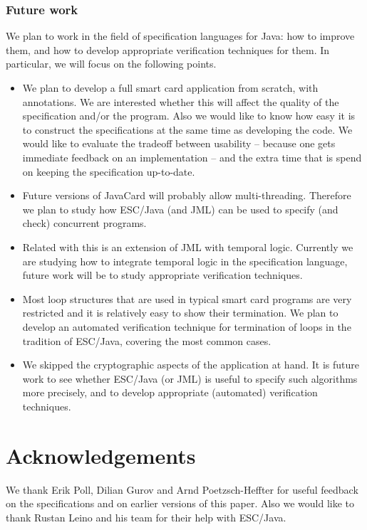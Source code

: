 \documentclass[a4paper]{llncs}
\begin{document}
\subsubsection{Future work} We plan to work in the field of
specification languages for Java: how to improve them, and how to
develop appropriate verification techniques for them. In particular,
we will focus on the following points.
\begin{itemize}
\item We plan to develop a full smart card application from scratch, with
annotations. We are interested whether this will affect the quality of 
the specification and/or the program. Also we would like to know how
easy it is to construct the specifications at the same time as
developing the code. We would like to evaluate the tradeoff between
usability -- because one gets immediate
feedback on an implementation -- and the extra time that
is spend on keeping the specification up-to-date.
\item Future versions of JavaCard will probably allow
multi-threading. Therefore we plan to study how ESC/Java (and JML)
can be used to specify (and check) concurrent programs.
\item Related with this is an extension of JML with
temporal logic. Currently we are studying how to integrate temporal
logic in the specification language, future work will be to study
appropriate verification techniques. 
\item Most loop structures that are used in typical smart card
programs are very restricted and it is relatively easy to show their
termination. We plan to develop an automated verification technique for
termination of loops in the tradition of ESC/Java, covering the most
common cases.
\item We skipped the cryptographic aspects of the application at
hand. It is future work to see whether ESC/Java (or JML) is useful to
specify such algorithms more precisely, and to develop appropriate
(automated) verification techniques.
\end{itemize}

\section*{Acknowledgements}
We thank Erik Poll, Dilian Gurov and Arnd Poetzsch-Heffter for useful
feedback on the specifications and on earlier versions of this
paper. Also we would like to thank Rustan Leino and his team for their 
help with ESC/Java.


\end{document}
